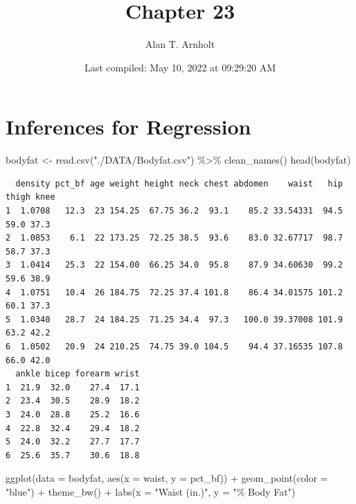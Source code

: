\documentclass[
]{article}
\title{Chapter 23}
\author{Alan T. Arnholt}
\date{Last compiled: May 10, 2022 at 09:29:20 AM}
\newenvironment{Shaded}{\begin{snugshade}}{\end{snugshade}}
\newcommand{\AttributeTok}[1]{\textcolor[rgb]{0.77,0.63,0.00}{#1}}
\newcommand{\FunctionTok}[1]{\textcolor[rgb]{0.00,0.00,0.00}{#1}}
\newcommand{\NormalTok}[1]{#1}
\newcommand{\OtherTok}[1]{\textcolor[rgb]{0.56,0.35,0.01}{#1}}
\newcommand{\SpecialCharTok}[1]{\textcolor[rgb]{0.00,0.00,0.00}{#1}}
\newcommand{\StringTok}[1]{\textcolor[rgb]{0.31,0.60,0.02}{#1}}
\begin{document}
\maketitle

{
\setcounter{tocdepth}{2}
\tableofcontents
}
\hypertarget{inferences-for-regression}{%
\section{Inferences for Regression}\label{inferences-for-regression}}

\begin{Shaded}
\begin{Highlighting}[]
\NormalTok{bodyfat }\OtherTok{\textless{}{-}} \FunctionTok{read.csv}\NormalTok{(}\StringTok{"./DATA/Bodyfat.csv"}\NormalTok{) }\SpecialCharTok{\%\textgreater{}\%} 
  \FunctionTok{clean\_names}\NormalTok{()}
\FunctionTok{head}\NormalTok{(bodyfat)}
\end{Highlighting}
\end{Shaded}

\begin{verbatim}
  density pct_bf age weight height neck chest abdomen    waist   hip thigh knee
1  1.0708   12.3  23 154.25  67.75 36.2  93.1    85.2 33.54331  94.5  59.0 37.3
2  1.0853    6.1  22 173.25  72.25 38.5  93.6    83.0 32.67717  98.7  58.7 37.3
3  1.0414   25.3  22 154.00  66.25 34.0  95.8    87.9 34.60630  99.2  59.6 38.9
4  1.0751   10.4  26 184.75  72.25 37.4 101.8    86.4 34.01575 101.2  60.1 37.3
5  1.0340   28.7  24 184.25  71.25 34.4  97.3   100.0 39.37008 101.9  63.2 42.2
6  1.0502   20.9  24 210.25  74.75 39.0 104.5    94.4 37.16535 107.8  66.0 42.0
  ankle bicep forearm wrist
1  21.9  32.0    27.4  17.1
2  23.4  30.5    28.9  18.2
3  24.0  28.8    25.2  16.6
4  22.8  32.4    29.4  18.2
5  24.0  32.2    27.7  17.7
6  25.6  35.7    30.6  18.8
\end{verbatim}

\begin{Shaded}
\begin{Highlighting}[]
\FunctionTok{ggplot}\NormalTok{(}\AttributeTok{data =}\NormalTok{ bodyfat, }\FunctionTok{aes}\NormalTok{(}\AttributeTok{x =}\NormalTok{ waist, }\AttributeTok{y =}\NormalTok{ pct\_bf)) }\SpecialCharTok{+} 
  \FunctionTok{geom\_point}\NormalTok{(}\AttributeTok{color =} \StringTok{"blue"}\NormalTok{) }\SpecialCharTok{+}
  \FunctionTok{theme\_bw}\NormalTok{() }\SpecialCharTok{+} 
  \FunctionTok{labs}\NormalTok{(}\AttributeTok{x =} \StringTok{"Waist (in.)"}\NormalTok{, }\AttributeTok{y =} \StringTok{"\% Body Fat"}\NormalTok{)}
\end{Highlighting}
\end{Shaded}
\end{document}

